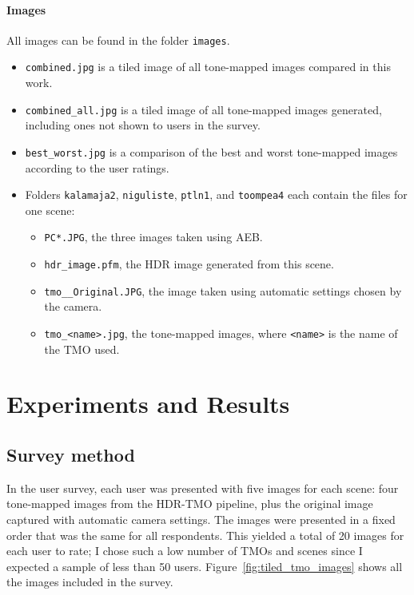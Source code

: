 \documentclass[a4paper]{scrartcl}
\begin{document}
\paragraph{Images} All images can be found in the folder \texttt{images}.

\begin{itemize}

\item \texttt{combined.jpg} is a tiled image of all tone-mapped images compared in this work.
\item \verb+combined_all.jpg+ is a tiled image of all tone-mapped images generated, including ones not shown to users in the survey.
\item \verb+best_worst.jpg+ is a comparison of the best and worst tone-mapped images according to the user ratings.
\item Folders \texttt{kalamaja2}, \texttt{niguliste}, \texttt{ptln1}, and \texttt{toompea4} each contain the files for one scene:
	\begin{itemize}
	\item \verb+PC*.JPG+, the three images taken using AEB.
	\item \verb+hdr_image.pfm+, the HDR image generated from this scene.
	\item \verb+tmo__Original.JPG+, the image taken using automatic settings chosen by the camera.
	\item \verb+tmo_<name>.jpg+, the tone-mapped images, where \texttt{<name>} is the name of the TMO used.
	\end{itemize}

\end{itemize}

\newpage
\section{Experiments and Results}

\subsection{Survey method}

In the user survey, each user was presented with five images for each scene: four tone-mapped images from the HDR-TMO pipeline, plus the original image captured with automatic camera settings. The images were presented in a fixed order that was the same for all respondents. This yielded a total of 20 images for each user to rate; I chose such a low number of TMOs and scenes since I expected a sample of less than 50 users. Figure~\ref{fig:tiled_tmo_images} shows all the images included in the survey.
\end{document}
